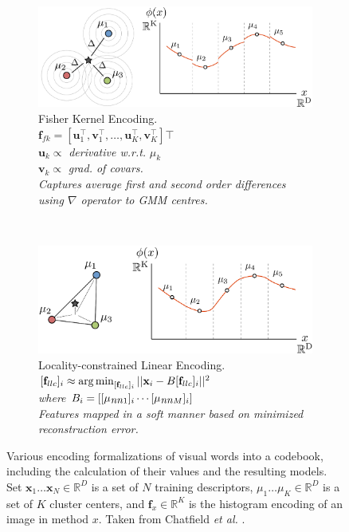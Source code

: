 \begin{figure}
    \begin{subfigure}[b]{0.45\textwidth}
        \centering
        \includegraphics[width=\textwidth]{EncFKNT3}
        \caption{Fisher Kernel Encoding.\\
        $\mathbf{f}_{fk} = [\mathbf{u}_1^\top, \mathbf{v}_1^\top, \ldots, \mathbf{u}_K^\top, \mathbf{v}_K^\top]\top$\\
        $\mathbf{u}_k \propto$ \emph{derivative w.r.t.} $\mu_k$\\
        $\mathbf{v}_k \propto$ \emph{grad. of covars.}\\
        \emph{Captures average first and second order differences using $\nabla$ operator to GMM centres.}}
        \label{fig:encfk}
    \end{subfigure}
    ~
    \begin{subfigure}[b]{0.45\textwidth}
        \centering
        \includegraphics[width=\textwidth]{EncLLCNT3}
        \caption{Locality-constrained Linear Encoding.\\
        $[\mathbf{f}_{llc}]_i \approx \operatorname*{arg\,min}_{[\mathbf{f}_{llc}]_i} ||\mathbf{x}_i - B[\mathbf{f}_{llc}]_i||^2$\\
        \emph{where} $B_i = [[\mu_{\mbox{\emph{nn}}1}]_i \cdots [\mu_{\mbox{\emph{nn}}M}]_i]$\\
        \emph{Features mapped in a soft manner based on minimized reconstruction error.}}
        \label{fig:encllc}
    \end{subfigure}
    
    \caption{Various encoding formalizations of visual words into a codebook, including the calculation of their values and the resulting models. Set $\mathbf{x}_1 \ldots \mathbf{x}_N \in \mathbb{R}^D$ is a set of $N$ training descriptors, $\mu_1 \ldots \mu_K \in \mathbb{R}^D$ is a set of $K$ cluster centers, and $\mathbf{f}_x \in \mathbb{R}^K$ is the histogram encoding of an image in method $x$. Taken from Chatfield \emph{et al.} \cite{chatfield2011devil}.}
    \label{fig:bowencoding}
\end{figure}


